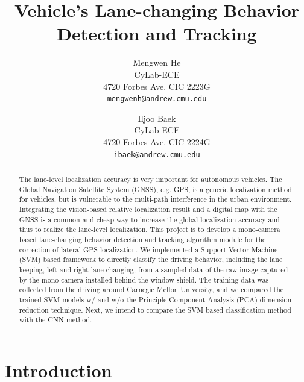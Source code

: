 \documentclass[10pt,twocolumn,letterpaper]{article}
\begin{document}
\title{ Vehicle's Lane-changing Behavior Detection and Tracking}

\author{
Mengwen He\\
CyLab-ECE\\
4720 Forbes Ave. CIC 2223G\\
{\tt\small mengwenh@andrew.cmu.edu}
\and
Iljoo Baek\\
CyLab-ECE\\
4720 Forbes Ave. CIC 2224G\\
{\tt\small ibaek@andrew.cmu.edu}
}

\maketitle

\begin{abstract}
   The lane-level localization accuracy is very important for autonomous vehicles. The Global Navigation Satellite System (GNSS), e.g. GPS, is a generic localization method for vehicles, but is vulnerable to the multi-path interference in the urban environment. Integrating the vision-based relative localization result and a digital map with the GNSS is a common and cheap way to increase the global localization accuracy and thus to realize the lane-level localization. This project is to develop a mono-camera based lane-changing behavior detection and tracking algorithm module for the correction of lateral GPS localization. We implemented a Support Vector Machine (SVM) based framework to directly classify the driving behavior, including the lane keeping, left and right lane changing, from a sampled data of the raw image captured by the mono-camera installed behind the window shield. The training data was collected from the driving around Carnegie Mellon University, and we compared the trained SVM models w/ and w/o the Principle Component Analysis (PCA) dimension reduction technique. Next, we intend to compare the SVM based classification method with the CNN method.
\end{abstract}

\section{Introduction}
\end{document}
